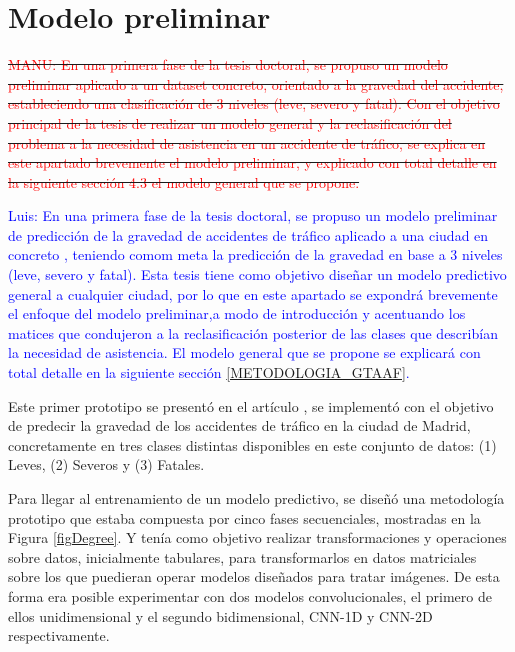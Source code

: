 \documentclass{uathesis-es}
\begin{document}
{	
	
	
	\section{Modelo preliminar}
	\label{METODOLOGIA_MODELO_PRELIMINAR}
	
	\sout{\textcolor{red}{MANU: En una primera fase de la tesis doctoral, se propuso un modelo preliminar aplicado a un dataset concreto, orientado a la gravedad del accidente, estableciendo una clasificación de 3 niveles (leve, severo y fatal). Con el objetivo principal de la tesis de realizar un modelo general y la reclasificación del problema a la necesidad de asistencia en un accidente de tráfico, se explica en este apartado brevemente el modelo preliminar, y explicado con total detalle en la siguiente sección 4.3 el modelo general que se propone.}}
	
	
	\textcolor{blue}{Luis: En una primera fase de la tesis doctoral, se propuso un modelo preliminar de predicción de la gravedad de accidentes de tráfico aplicado a una ciudad en concreto \cite{PEREZSALA2023113245}, teniendo comom meta la predicción de la gravedad en base a 3 niveles (leve, severo y fatal). Esta tesis tiene como objetivo diseñar un modelo predictivo general a cualquier ciudad, por lo que en este apartado se expondrá brevemente el enfoque del modelo preliminar,a modo de introducción y acentuando los matices que condujeron a la reclasificación posterior de las clases que describían la necesidad de asistencia. El modelo general que se propone se explicará con total detalle en la siguiente sección \ref{METODOLOGIA_GTAAF}.}
	
	Este primer prototipo se presentó en el artículo , se implementó con el objetivo de predecir la gravedad de los accidentes de tráfico en la ciudad de Madrid, concretamente en tres clases distintas disponibles en este conjunto de datos: (1) Leves, (2) Severos y (3) Fatales.
	
	Para llegar al entrenamiento de un modelo predictivo, se diseñó una metodología prototipo que estaba compuesta por cinco fases secuenciales, mostradas en la Figura \ref{figDegree}. Y tenía como objetivo realizar transformaciones y operaciones sobre datos, inicialmente tabulares, para transformarlos en datos matriciales sobre los que puedieran operar modelos diseñados para tratar imágenes. De esta forma era posible experimentar con dos modelos convolucionales, el primero de ellos unidimensional y el segundo bidimensional, CNN-1D y CNN-2D respectivamente.
	
}
\end{document}
